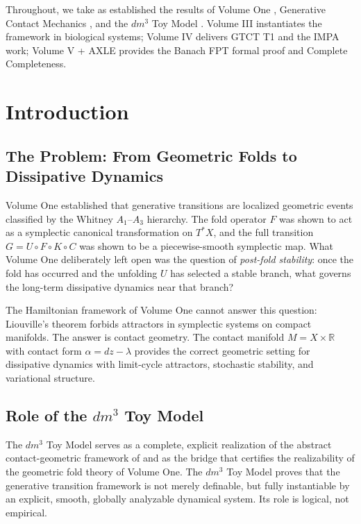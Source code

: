 \documentclass[11pt]{article}
\theoremstyle{boxed}
\begin{document}
Throughout, we take as established the results of Volume One \cite{VolI},
Generative Contact Mechanics \cite{GCM}, and the $dm^3$ Toy Model \cite{dm3}.
Volume III instantiates the framework in biological systems; Volume IV delivers
GTCT T1 and the IMPA work; Volume V + AXLE provides the Banach FPT formal proof
and Complete Completeness.

\section{Introduction}

\subsection{The Problem: From Geometric Folds to Dissipative Dynamics}

Volume One established that generative transitions are localized geometric events
classified by the Whitney $A_1$--$A_3$ hierarchy. The fold operator $F$ was shown
to act as a symplectic canonical transformation on $T^{*}X$, and the full transition
$G = U \circ F \circ K \circ C$ was shown to be a piecewise-smooth symplectic map.
What Volume One deliberately left open was the question of \emph{post-fold stability}:
once the fold has occurred and the unfolding $U$ has selected a stable branch, what
governs the long-term dissipative dynamics near that branch?

The Hamiltonian framework of Volume One cannot answer this question: Liouville's
theorem forbids attractors in symplectic systems on compact manifolds. The answer
is contact geometry. The contact manifold $M = X \times \mathbb{R}$ with contact
form $\alpha = dz - \lambda$ provides the correct geometric setting for dissipative
dynamics with limit-cycle attractors, stochastic stability, and variational structure.

\subsection{Role of the $dm^3$ Toy Model}

The $dm^3$ Toy Model \cite{dm3} serves as a complete, explicit realization of the
abstract contact-geometric framework of \cite{GCM} and as the bridge that certifies
the realizability of the geometric fold theory of Volume One. The $dm^3$ Toy Model
proves that the generative transition framework is not merely definable, but fully
instantiable by an explicit, smooth, globally analyzable dynamical system. Its role
is logical, not empirical.
\end{document}
